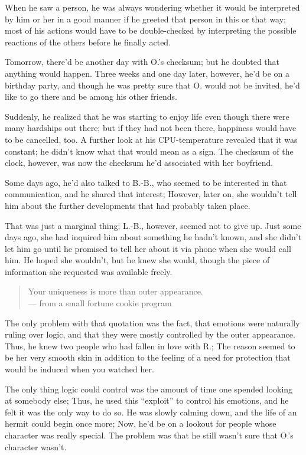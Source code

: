 When he saw a person, he was always wondering whether it would be interpreted by him or her in a good manner if he greeted that person in this or that way; most of his actions would have to be double-checked by interpreting the possible reactions of the others before he finally acted.

Tomorrow, there'd be another day with O.'s checksum; but he doubted that anything would happen. Three weeks and one day later, however, he'd be on a birthday party, and though he was pretty sure that O. would not be invited, he'd like to go there and be among his other friends.

Suddenly, he realized that he was starting to enjoy life even though there were many hardships out there; but if they had not been there, happiness would have to be cancelled, too. A further look at his CPU-temperature revealed that it was constant; he didn't know what that would mean as a sign. The checksum of the clock, however, was now the checksum he'd associated with her boyfriend.

Some days ago, he'd also talked to B.-B., who seemed to be interested in that communication, and he shared that interest; However, later on, she wouldn't tell him about the further developments that had probably taken place.

That was just a marginal thing; L.-B., however, seemed not to give up. Just some days ago, she had inquired him about something he hadn't known, and she didn't let him go until he promised to tell her about it via phone when she would call him. He hoped she wouldn't, but he knew she would, though the piece of information she requested was available freely. 
\begin{quote}
Your uniqueness is more than outer appearance.\\
--- from a small fortune cookie program
\end{quote}
The only problem with that quotation was the fact, that emotions were naturally ruling over logic, and that they were mostly controlled by the outer appearance. Thus, he knew two people who had fallen in love with R.; The reason seemed to be her very smooth skin in addition to the feeling of a need for protection that would be induced when you watched her.

The only thing logic could control was the amount of time one spended looking at somebody else; Thus, he used this \enquote{exploit} to control his emotions, and he felt it was the only way to do so. 
He was slowly calming down, and the life of an hermit could begin once more; Now, he'd be on a lookout for people whose character was really special. 
The problem was that he still wasn't sure that O.'s character wasn't.

